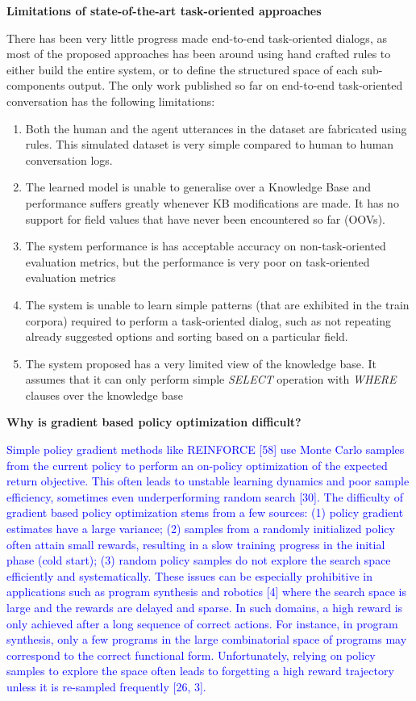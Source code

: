 \noindent \textbf{Limitations of state-of-the-art task-oriented approaches}

There has been very little progress made end-to-end task-oriented dialogs, as most of the proposed approaches has been around using hand crafted rules to either build the entire system, or to define the structured space of each sub-components output. The only work published so far on end-to-end task-oriented conversation has the following limitations:
\begin{enumerate}
\item Both the human and the agent utterances in the dataset are fabricated using rules. This simulated dataset is very simple compared to human to human conversation logs.
\item The learned model is unable to generalise over a Knowledge Base and performance suffers greatly whenever KB modifications are made. It has no support for field values that have never been encountered so far (OOVs).
\item The system performance is has acceptable accuracy on non-task-oriented evaluation metrics, but the performance is very poor on task-oriented evaluation metrics
\item The system is unable to learn simple patterns (that are exhibited in the train corpora) required to perform a task-oriented dialog, such as not repeating already suggested options and sorting based on a particular field.
\item The system proposed has a very limited view of the knowledge base. It assumes that it can only perform simple {\em SELECT} operation with {\em WHERE} clauses over the knowledge base
\end{enumerate} 

\noindent \textbf{Why is gradient based policy optimization difficult?}

\textcolor{blue}{Simple policy gradient methods like REINFORCE [58] use Monte Carlo samples from the current policy to perform an on-policy optimization of the expected return objective. This often leads to unstable learning dynamics and poor sample efficiency, sometimes even underperforming random search [30].
The difficulty of gradient based policy optimization stems from a few sources: (1) policy gradient estimates have a large variance; (2) samples from a randomly initialized policy often attain small rewards, resulting in a slow training progress in the initial phase (cold start); (3) random policy samples do not explore the search space efficiently and systematically. These issues can be especially prohibitive in applications such as program synthesis and robotics [4] where the search space is large and the rewards are delayed and sparse. In such domains, a high reward is only achieved after a long sequence of correct actions. For instance, in program synthesis, only a few programs in the large combinatorial space of programs may correspond to the correct functional form. Unfortunately, relying on policy samples to explore the space often leads to forgetting a high reward trajectory unless it is re-sampled frequently [26, 3].}

